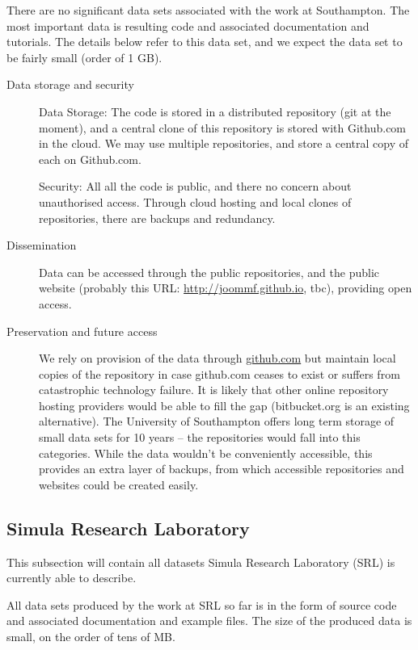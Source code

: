 \documentclass[12pt]{article}
\begin{document}
There are no significant data sets associated with the work at Southampton. The most important data is resulting code and associated documentation and tutorials. The details below refer to this data set, and we expect the data set to be fairly small (order of 1 GB).
\begin{description}
\item[Data storage and security] Data Storage: The code is stored in a distributed repository (git at the moment), and a central clone of this repository is stored with Github.com in the cloud. We may use multiple repositories, and store a central copy of each on Github.com.

  Security: All all the code is public, and there no concern about unauthorised access. Through cloud hosting and local clones of repositories, there are backups and redundancy.
\item[Dissemination] Data can be accessed through the public repositories, and the public website (probably this URL: \href{http://joommf.github.io}{http://joommf.github.io}, tbc), providing open access.
\item[Preservation and future access] We rely on provision of the data through \href{github.com}{github.com} but maintain local copies of the repository in case github.com ceases to exist or suffers from catastrophic technology failure. It is likely that other online repository hosting providers would be able to fill the gap (bitbucket.org is an existing alternative). The University of Southampton offers long term storage of small data sets for 10 years -- the repositories would fall into this categories. While the data wouldn't be conveniently accessible, this provides an extra layer of backups, from which accessible repositories and websites could be created easily.
\end{description}


\subsection{Simula Research Laboratory}

This subsection will contain all datasets Simula Research Laboratory
(SRL) is currently able to describe.

All data sets produced by the work at SRL so far is in the form of
source code and associated documentation and example files.
The size of the produced data is small, on the order of tens of MB.
\end{document}
